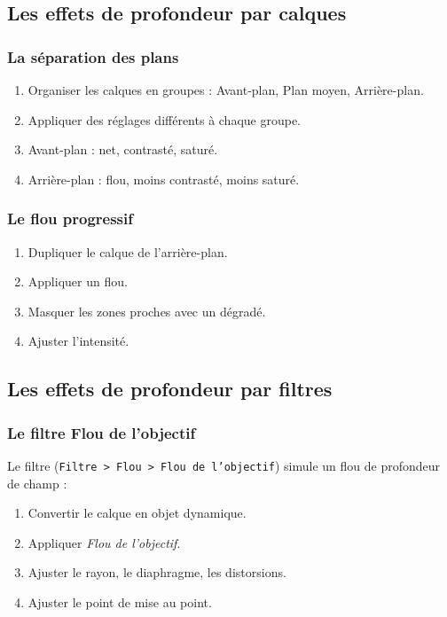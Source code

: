 \subsection{Les effets de profondeur par calques}

\subsubsection{La séparation des plans}

\begin{enumerate}
    \item Organiser les calques en groupes : Avant-plan, Plan moyen, Arrière-plan.
    \item Appliquer des réglages différents à chaque groupe.
    \item Avant-plan : net, contrasté, saturé.
    \item Arrière-plan : flou, moins contrasté, moins saturé.
\end{enumerate}

\subsubsection{Le flou progressif}

\begin{enumerate}
    \item Dupliquer le calque de l'arrière-plan.
    \item Appliquer un flou.
    \item Masquer les zones proches avec un dégradé.
    \item Ajuster l'intensité.
\end{enumerate}

\subsection{Les effets de profondeur par filtres}

\subsubsection{Le filtre Flou de l'objectif}

Le filtre  (\texttt{Filtre > Flou > Flou de l'objectif}) simule un flou de profondeur de champ :

\begin{enumerate}
    \item Convertir le calque en objet dynamique.
    \item Appliquer \emph{Flou de l'objectif}.
    \item Ajuster le rayon, le diaphragme, les distorsions.
    \item Ajuster le point de mise au point.
\end{enumerate}

